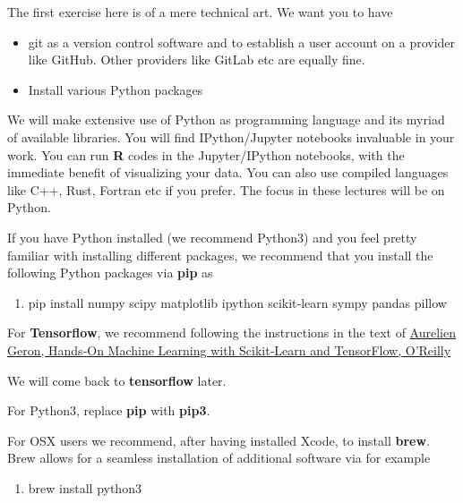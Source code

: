 \documentclass[%
oneside,                 %
final,                   %
10pt]{article}
\newenvironment{doconceexercise}{}{}
\newcounter{doconceexercisecounter}
\begin{document}
\begin{doconceexercise}

                             

The first exercise here is of a mere technical art. We want you to have 
\begin{itemize}
\item git as a version control software and to establish a user account on a provider like GitHub. Other providers like GitLab etc are equally fine. 

\item Install various Python packages
\end{itemize}

\noindent
We will make extensive use of Python as programming language and its
myriad of available libraries.  You will find
IPython/Jupyter notebooks invaluable in your work.  You can run \textbf{R}
codes in the Jupyter/IPython notebooks, with the immediate benefit of
visualizing your data. You can also use compiled languages like C++,
Rust, Fortran etc if you prefer. The focus in these lectures will be
on Python.

If you have Python installed (we recommend Python3) and you feel
pretty familiar with installing different packages, we recommend that
you install the following Python packages via \textbf{pip} as 

\begin{enumerate}
\item pip install numpy scipy matplotlib ipython scikit-learn sympy pandas pillow 
\end{enumerate}

\noindent
For \textbf{Tensorflow}, we recommend following the instructions in the text of 
\href{{http://shop.oreilly.com/product/0636920052289.do}}{Aurelien Geron, Hands‑On Machine Learning with Scikit‑Learn and TensorFlow, O'Reilly}

We will come back to \textbf{tensorflow} later. 

For Python3, replace \textbf{pip} with \textbf{pip3}.

For OSX users we recommend, after having installed Xcode, to
install \textbf{brew}. Brew allows for a seamless installation of additional
software via for example 

\begin{enumerate}
\item brew install python3
\end{enumerate}


\end{doconceexercise}
\end{document}
